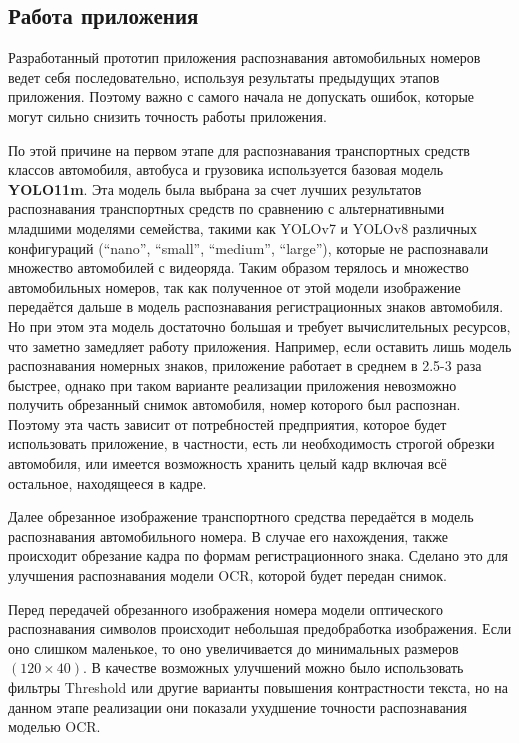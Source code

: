 \documentclass[a4paper,12pt]{article}
\begin{document}
\subsection{Работа приложения}

Разработанный прототип приложения распознавания автомобильных номеров ведет себя последовательно, используя результаты предыдущих этапов приложения. Поэтому важно с самого начала не допускать ошибок, которые могут сильно снизить точность работы приложения.

По этой причине на первом этапе для распознавания транспортных средств классов автомобиля, автобуса и грузовика используется базовая модель \textbf{YOLO11m}. Эта модель была выбрана за счет лучших результатов распознавания транспортных средств по сравнению с альтернативными младшими моделями семейства, такими как YOLOv7 и YOLOv8 различных конфигураций (``nano'', ``small'', ``medium'', ``large''), которые не распознавали множество автомобилей с видеоряда. Таким образом терялось и множество автомобильных номеров, так как полученное от этой модели изображение передаётся дальше в модель распознавания регистрационных знаков автомобиля. Но при этом эта модель достаточно большая и требует вычислительных ресурсов, что заметно замедляет работу приложения. Например, если оставить лишь модель распознавания номерных знаков, приложение работает в среднем в 2.5-3 раза быстрее, однако при таком варианте реализации приложения невозможно получить обрезанный снимок автомобиля, номер которого был распознан. Поэтому эта часть зависит от потребностей предприятия, которое будет использовать приложение, в частности, есть ли необходимость строгой обрезки автомобиля, или имеется возможность хранить целый кадр включая всё остальное, находящееся в кадре.

Далее обрезанное изображение транспортного средства передаётся в модель распознавания автомобильного номера. В случае его нахождения, также происходит обрезание кадра по формам регистрационного знака. Сделано это для улучшения распознавания модели OCR, которой будет передан снимок.

Перед передачей обрезанного изображения номера модели оптического распознавания символов происходит небольшая предобработка изображения. Если оно слишком маленькое, то оно увеличивается до минимальных размеров $(120 \times 40)$.
В качестве возможных улучшений можно было использовать фильтры Threshold или другие варианты повышения контрастности текста, но на данном этапе реализации они показали ухудшение точности распознавания моделью OCR.
\end{document}
